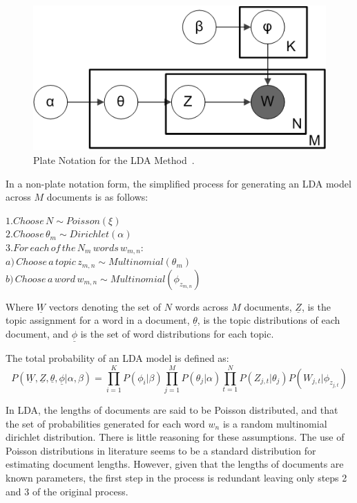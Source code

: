 \documentclass[10pt]{report}
\begin{document}
\begin {figure}[h!]
  \centering
  \includegraphics[scale=0.5]{lda_plate}
  \caption{Plate Notation for the LDA Method~\cite{Bkkbrad2018-yt}.
    \label{fig:lda_plate}}
\end{figure}

\renewcommand{\baselinestretch}{2.0}\normalsize
In a non-plate notation form, the simplified process for generating an LDA model across \(M\) documents is as follows:

\renewcommand{\baselinestretch}{1.0}\normalsize
\(1. Choose\, N \sim Poisson(\xi)\)\\
\(2. Choose\, \theta_m \sim Dirichlet(\alpha)\)\\
\(3. For\, each\, of\, the\, N_m\, words\, w_{m,n}:\)\\
{\hspace*{15mm} \(a)\, Choose\, a\, topic\, z_{m,n} \sim Multinomial(\theta_m)  \)}\\
{\hspace*{15mm} \(b)\, Choose\, a\, word\, w_{m,n} \sim Multinomial(\phi_{z_{m,n}}) \)}

\renewcommand{\baselinestretch}{2.0}\normalsize
Where $\underline{W}$ vectors denoting the set of $N$ words across $M$ documents, $\underline{Z}$, is the topic assignment for a word in a document, $\underline{\theta}$, is the topic distributions of each document, and $\underline{\phi}$ is the set of word distributions for each topic.

\renewcommand{\baselinestretch}{1.0}\normalsize
The total probability of an LDA model is defined as:
\[
  P(\underline{W},\underline{Z},\underline{\theta},\underline{\phi}|\alpha,\beta) = \prod^{K}_{i=1} P(\phi_i|\beta) \prod^{M}_{j=1} P(\theta_j|\alpha)\prod^{N}_{t=1} P(Z_{j,t} | \theta_j)P(W_{j,t} | \phi_{z_{j,t}})
\]
\renewcommand{\baselinestretch}{2.0}\normalsize

In LDA, the lengths of documents are said to be Poisson distributed, and that the set of probabilities  generated for each word \(w_n\) is a random multinomial dirichlet distribution. There is little reasoning for these assumptions. The use of Poisson distributions in literature seems to be a standard distribution for estimating document lengths. However, given that the lengths of documents are known parameters, the first step in the process is redundant leaving only steps 2 and 3 of the original process.
\end{document}
